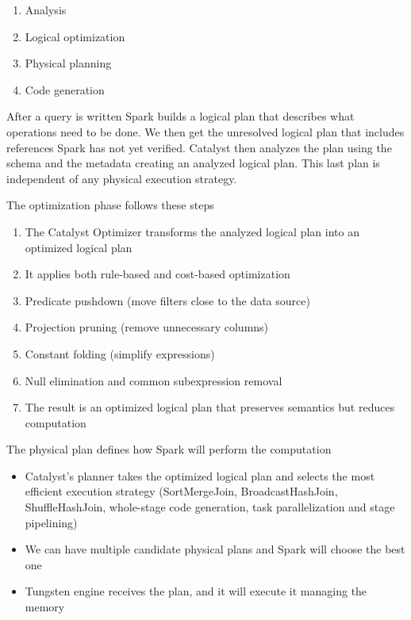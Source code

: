 \begin{enumerate}
    \item Analysis
    \item Logical optimization
    \item Physical planning
    \item Code generation
\end{enumerate}

After a query is written Spark builds a logical plan that describes what operations need to be done. We then get the unresolved logical plan that includes references Spark has not yet verified. Catalyst then analyzes the plan using the schema and the metadata creating an analyzed logical plan. This last plan is independent of any physical execution strategy.

\vspace{10pt}

The optimization phase follows these steps

\begin{enumerate}
    \item The Catalyst Optimizer transforms the analyzed logical plan into an optimized logical plan
    \item It applies both rule-based and cost-based optimization
    \item Predicate pushdown (move filters close to the data source)
    \item Projection pruning (remove unnecessary columns)
    \item Constant folding (simplify expressions)
    \item Null elimination and common subexpression removal
    \item The result is an optimized logical plan that preserves semantics but reduces computation
\end{enumerate}

The physical plan defines how Spark will perform the computation
\begin{itemize}
    \item Catalyst's planner takes the optimized logical plan and selects the most efficient execution strategy (SortMergeJoin, BroadcastHashJoin, ShuffleHashJoin, whole-stage code generation, task parallelization and stage pipelining)
    \item We can have multiple candidate physical plans and Spark will choose the best one
    \item Tungsten engine receives the plan, and it will execute it managing the memory 
\end{itemize}

